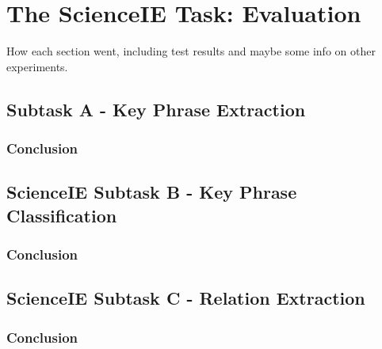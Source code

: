 \section{The ScienceIE Task: Evaluation}

How each section went, including test results and maybe some info on other experiments.

\subsection{Subtask A - Key Phrase Extraction}

\subsubsection{Conclusion}

\subsection{ScienceIE Subtask B - Key Phrase Classification}

\subsubsection{Conclusion}

\subsection{ScienceIE Subtask C - Relation Extraction}

\subsubsection{Conclusion}
